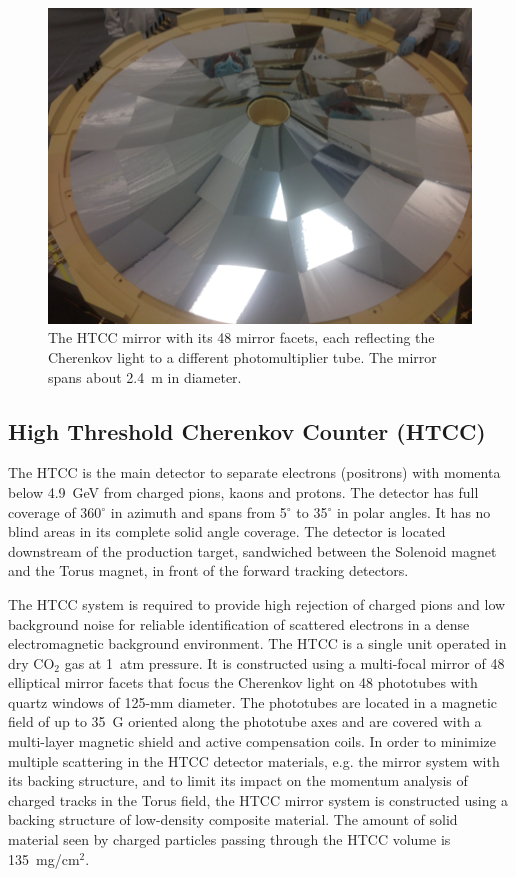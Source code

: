 \documentclass[final,3p,twocolumn]{elsarticle}
\begin{document}
\begin{figure}[htbp!]
\centerline{\includegraphics[angle=90,width=0.65\columnwidth]{HTCC-mirror.png}}
\caption{The HTCC mirror with its 48 mirror facets, each reflecting the Cherenkov light to a different photomultiplier
tube. The mirror spans about 2.4~m in diameter.}
\label{htcc}
\end{figure}

\subsection{High Threshold Cherenkov Counter (HTCC)}

The HTCC is the main detector to separate electrons (positrons) with momenta below 4.9~GeV from charged pions,
kaons and protons. The detector has full coverage of 360$^\circ$ in azimuth and spans from 5$^\circ$ to 35$^\circ$
in polar angles. It has no blind areas in its complete solid angle coverage. The detector is located downstream of the
production target, sandwiched between the Solenoid magnet and the Torus magnet, in front of the forward tracking
detectors. 

The HTCC system is required to provide high rejection of charged pions and low background noise for reliable 
identification of scattered electrons in a dense electromagnetic background environment. The HTCC is a single unit
operated in dry CO$_2$ gas at 1~atm pressure. It is constructed using a multi-focal mirror of 48 elliptical mirror
facets that focus the Cherenkov light on 48 phototubes with quartz windows of 125-mm diameter. The phototubes
are located in a magnetic field of up to 35~G oriented along the phototube axes and are covered with a multi-layer
magnetic shield and active compensation coils. In order to minimize multiple scattering in the HTCC detector materials,
e.g. the mirror system with its backing structure, and to limit its impact on the momentum analysis of charged tracks in
the Torus field, the HTCC mirror system is constructed using a backing structure of low-density composite material. 
The amount of solid material seen by charged particles passing through the HTCC volume is 135~mg/cm$^2$. 
\end{document}

